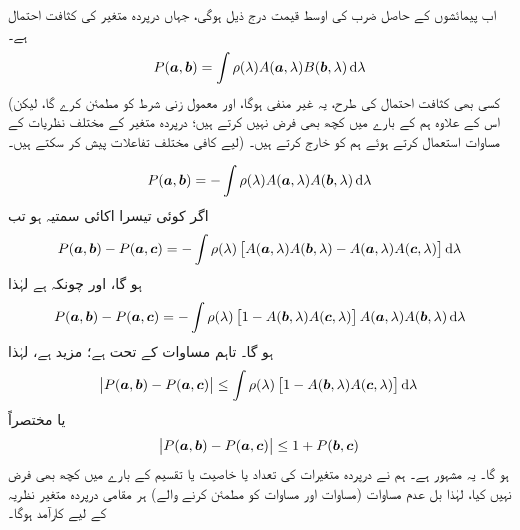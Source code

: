  اب پیمائشوں کے حاصل ضرب کی اوسط قیمت درج ذیل ہوگی، جہاں  درپردہ متغیر کی کثافت احتمال ہے۔
\begin{align}
	P(\kvec{a}, \kvec{b}) = \int\rho(\lambda)A(\kvec{a}, \lambda)B(\kvec{b}, \lambda)\dif\lambda
\end{align}
(کسی بھی کثافت احتمال کی طرح، یہ غیر منفی ہوگا، اور معمول زنی شرط  کو مطمئن کرے گا، لیکن اس کے علاوہ ہم  کے بارے میں کچھ بھی فرض نہیں کرتے ہیں؛ درپردہ متغیر کے مختلف نظریات  کے لیے کافی مختلف تفاعلات پیش کر سکتے ہیں۔) مساوات  استعمال کرتے ہوئے ہم  کو خارج کرتے ہیں۔


\begin{align}
	P(\kvec{a}, \kvec{b}) = -\int\rho(\lambda)A(\kvec{a}, \lambda)A(\kvec{b}, \lambda)\dif\lambda
\end{align}
اگر  کوئی تیسرا اکائی سمتیہ ہو تب
\begin{align}
	P(\kvec{a}, \kvec{b})-P(\kvec{a}, \kvec{c}) = -\int\rho(\lambda)\left[A(\kvec{a}, \lambda)A(\kvec{b}, \lambda)-A(\kvec{a}, \lambda)A(\kvec{c}, \lambda)\right]\dif\lambda
\end{align}
ہو گا، اور چونکہ  ہے لہٰذا 
\begin{align}
	P(\kvec{a}, \kvec{b})-P(\kvec{a}, \kvec{c}) =-\int\rho(\lambda)\left[1-A(\kvec{b}, \lambda)A(\kvec{c}, \lambda)\right]A(\kvec{a}, \lambda)A(\kvec{b}, \lambda)\dif\lambda
\end{align}
ہو گا۔ تاہم مساوات  کے تحت ہے؛ مزید
 ہے، لہٰذا 
\begin{align}
	\abs{P(\kvec{a}, \kvec{b})-P(\kvec{a},\kvec{c})}\leq\int\rho(\lambda)\left[1-A(\kvec{b}, \lambda)A(\kvec{c}, \lambda)\right]\dif\lambda
\end{align}
یا مختصراً 
\begin{align}
	\abs{P({{\boldsymbol{a}}}, {{\boldsymbol{b}}})-P({{\boldsymbol{a}}}, {{\boldsymbol{c}}})}\leq1+P({{\boldsymbol{b}}}, {{\boldsymbol{c}}})
\end{align}
ہو گا۔ یہ مشہور  ہے۔ ہم نے درپردہ متغیرات کی تعداد یا خاصیت یا تقسیم  کے بارے میں کچھ بھی فرض نہیں کیا، لہٰذا بل عدم مساوات (مساوات  اور مساوات  کو مطمئن کرنے والے) ہر مقامی درپردہ متغیر نظریہ کے لیے کارآمد ہوگا۔

